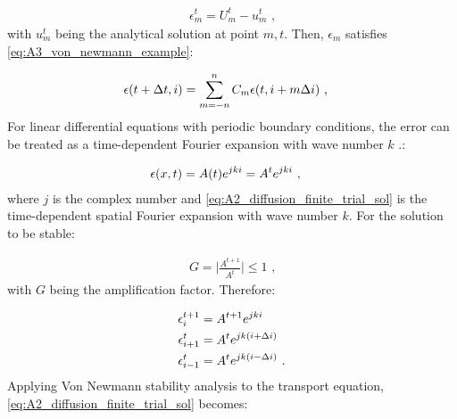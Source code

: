 \begin{equation}
    \begin{aligned}
        \epsilon_m^t=U_m^t-u_m^t\text{ ,} 
    \end{aligned} \label{eq:A2_error_function}
\end{equation}
\noindent with $u_m^t$ being the analytical solution at point $m,t$. Then, $\epsilon_m$ satisfies \autoref{eq:A3_von_newmann_example}:

\begin{equation}
    \begin{aligned}
        \epsilon \qty(t+\Delta t, i)&=\sum_{m=-n}^n C_m \epsilon\qty(t,i+m\Delta i)\text{ ,} 
    \end{aligned}
\end{equation}
\noindent For linear differential equations with periodic boundary conditions, the error can be treated as a time-dependent Fourier expansion with wave number $k$ \citep{cdi_wiley_ebooks_10_1002_9783527683147_ch11_ch11}.:

\begin{equation}
    \begin{aligned}
    \epsilon\qty(x,t)&=A\qty(t)e^{jki}=A^te^{jki}\text{ ,} 
    \end{aligned} \label{eq:A2_diffusion_finite_trial_sol}
\end{equation}
\noindent where $j$ is the complex number and \autoref{eq:A2_diffusion_finite_trial_sol} is the time-dependent spatial Fourier expansion with wave number $k$. For the solution to be stable:

\begin{equation}
    \begin{aligned}
        G=\bigg| \frac{A^{t+1}}{A^t}\bigg| \leq 1\text{ ,} 
    \end{aligned}
\end{equation} 
\noindent with $G$ being the amplification factor. Therefore:

\begin{equation}
    \begin{aligned}
    \epsilon_i^{t+1}&= A^{t+1}e^{jki} \\
    \epsilon_{i+1}^{t}&= A^{t}e^{jk\qty(i+\Delta i)} \\
    \epsilon_{i-1}^{t}&= A^{t}e^{jk\qty(i-\Delta i)}\text{ .} 
    \end{aligned} \label{eq:A2_diffusion_finite_trial_sol2}
\end{equation}
Applying Von Newmann stability analysis to the transport equation, \autoref{eq:A2_diffusion_finite_trial_sol} becomes:

